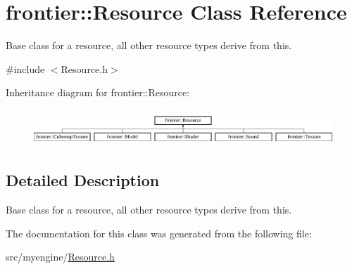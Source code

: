 \hypertarget{classfrontier_1_1_resource}{}\section{frontier\+:\+:Resource Class Reference}
\label{classfrontier_1_1_resource}


Base class for a resource, all other resource types derive from this.  




{\ttfamily \#include $<$Resource.\+h$>$}

Inheritance diagram for frontier\+:\+:Resource\+:\begin{figure}[H]
\begin{center}
\leavevmode
\includegraphics[height=1.382716cm]{classfrontier_1_1_resource}
\end{center}
\end{figure}


\subsection{Detailed Description}
Base class for a resource, all other resource types derive from this. 

The documentation for this class was generated from the following file\+:\begin{DoxyCompactItemize}
\item 
src/myengine/\hyperlink{_resource_8h}{Resource.\+h}\end{DoxyCompactItemize}
